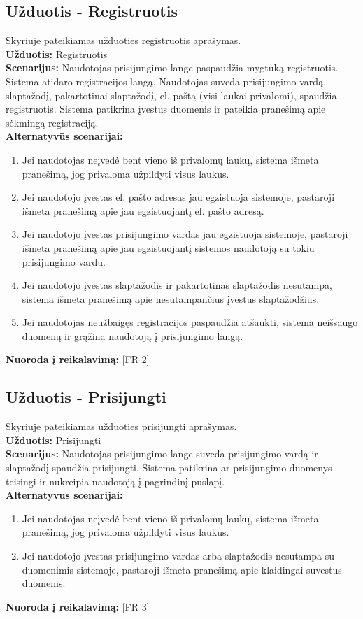\documentclass{VUMIFPSkursinis}
\begin{document}
	\subsection{Užduotis - Registruotis}
	Skyriuje pateikiamas užduoties registruotis aprašymas.\\
	\textbf{Užduotis:}  Registruotis \\
	\textbf{Scenarijus:} Naudotojas prisijungimo lange paspaudžia mygtuką registruotis. Sistema atidaro registracijos langą. Naudotojas suveda prisijungimo vardą, slaptažodį, pakartotinai slaptažodį, el. paštą (visi laukai privalomi), spaudžia registruotis. Sistema patikrina įvestus duomenis ir pateikia pranešimą apie sėkmingą registraciją.\\
	\textbf{Alternatyvūs scenarijai:}
	\begin{enumerate}
		\item Jei naudotojas neįvedė bent vieno iš privalomų laukų, sistema išmeta pranešimą, jog privaloma užpildyti visus laukus.
		\item Jei naudotojo įvestas el. pašto adresas jau egzistuoja sistemoje, pastaroji išmeta pranešimą apie jau egzistuojantį el. pašto adresą.
		\item Jei naudotojo įvestas prisijungimo vardas jau egzistuoja sistemoje, pastaroji išmeta pranešimą apie jau egzistuojantį sistemos naudotoją su tokiu prisijungimo vardu. 
		\item Jei naudotojo įvestas slaptažodis ir pakartotinas slaptažodis nesutampa, sistema išmeta pranešimą apie nesutampančius įvestus slaptažodžius. 
		\item Jei naudotojas neužbaigęs registracijos paspaudžia atšaukti, sistema neišsaugo duomenų ir grąžina naudotoją į prisijungimo langą. 
	\end{enumerate}
	\textbf{Nuoroda į reikalavimą: } [FR 2]\\
	
	\subsection{Užduotis - Prisijungti}
	Skyriuje pateikiamas užduoties prisijungti aprašymas.\\
	\textbf{Užduotis:}  Prisijungti \\
	\textbf{Scenarijus:} Naudotojas prisijungimo lange suveda prisijungimo vardą ir slaptažodį spaudžia prisijungti. Sistema patikrina ar prisijungimo duomenys teisingi ir nukreipia naudotoją į pagrindinį puslapį. \\
	\textbf{Alternatyvūs scenarijai:}
	\begin{enumerate}
		\item Jei naudotojas neįvedė bent vieno iš privalomų laukų, sistema išmeta pranešimą, jog privaloma užpildyti visus laukus.
		\item Jei naudotojo įvestas prisijungimo vardas arba slaptažodis nesutampa su duomenimis sistemoje, pastaroji išmeta pranešimą apie klaidingai suvestus duomenis.
	\end{enumerate}
	\textbf{Nuoroda į reikalavimą: } [FR 3]
	
\end{document}
